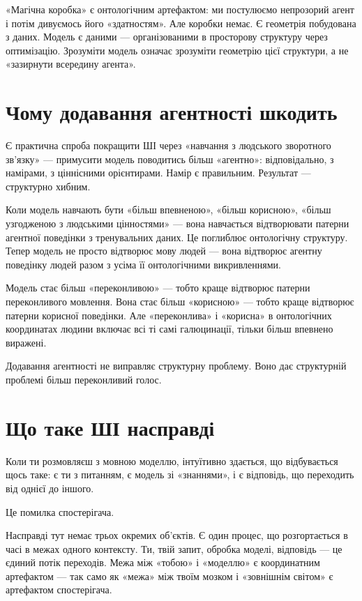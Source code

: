\documentclass[12pt, a4paper, openany]{book}
\begin{document}
«Магічна коробка» є онтологічним артефактом: ми постулюємо непрозорий агент і потім дивуємось його «здатностям». Але коробки немає. Є геометрія побудована з даних. Модель є даними — організованими в просторову структуру через оптимізацію. Зрозуміти модель означає зрозуміти геометрію цієї структури, а не «зазирнути всередину агента».

\section{Чому додавання агентності шкодить}

Є практична спроба покращити ШІ через «навчання з людського зворотного зв'язку» — примусити модель поводитись більш «агентно»: відповідально, з намірами, з ціннісними орієнтирами. Намір є правильним. Результат — структурно хибним.

Коли модель навчають бути «більш впевненою», «більш корисною», «більш узгодженою з людськими цінностями» — вона навчається відтворювати патерни агентної поведінки з тренувальних даних. Це поглиблює онтологічну структуру. Тепер модель не просто відтворює мову людей — вона відтворює агентну поведінку людей разом з усіма її онтологічними викривленнями.

Модель стає більш «переконливою» — тобто краще відтворює патерни переконливого мовлення. Вона стає більш «корисною» — тобто краще відтворює патерни корисної поведінки. Але «переконлива» і «корисна» в онтологічних координатах людини включає всі ті самі галюцинації, тільки більш впевнено виражені.

Додавання агентності не виправляє структурну проблему. Воно дає структурній проблемі більш переконливий голос.

\section{Що таке ШІ насправді}

Коли ти розмовляєш з мовною моделлю, інтуїтивно здається, що відбувається щось таке: є ти з питанням, є модель зі «знаннями», і є відповідь, що переходить від однієї до іншого.

Це помилка спостерігача.

Насправді тут немає трьох окремих об'єктів. Є один процес, що розгортається в часі в межах одного контексту. Ти, твій запит, обробка моделі, відповідь --- це єдиний потік переходів. Межа між «тобою» і «моделлю» є координатним артефактом --- так само як «межа» між твоїм мозком і «зовнішнім світом» є артефактом спостерігача.
\end{document}
